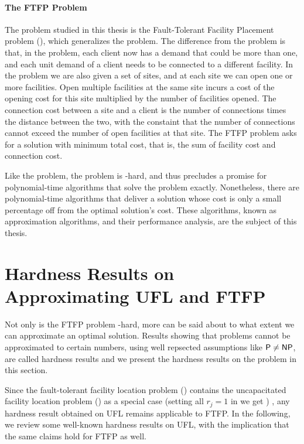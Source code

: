 \documentclass[oneside,final]{ucr}
\begin{document}
\paragraph{The FTFP Problem}
The problem studied in this thesis is the Fault-Tolerant
Facility Placement problem (\FTFP), which generalizes the
{\UFL} problem. The difference from the {\UFL} problem is
that, in the {\FTFP} problem, each client now has a demand
that could be more than one, and each unit demand of a
client needs to be connected to a different facility. In the
{\FTFP} problem we are also given a set of sites, and at
each site we can open one or more facilities. Open multiple
facilities at the same site incurs a cost of the opening
cost for this site multiplied by the number of facilities
opened. The connection cost between a site and a client is
the number of connections times the distance between the
two, with the constaint that the number of connections
cannot exceed the number of open facilities at that
site. The FTFP problem asks for a solution with minimum
total cost, that is, the sum of facility cost and connection
cost.

Like the {\UFL} problem, the {\FTFP} problem is \NP-hard,
and thus precludes a promise for polynomial-time algorithms
that solve the problem exactly. Nonetheless, there are
polynomial-time algorithms that deliver a solution whose
cost is only a small percentage off from the optimal
solution's cost. These algorithms, known as approximation
algorithms, and their performance analysis, are the subject
of this thesis.

\section{Hardness Results on Approximating UFL and FTFP}
\label{sec:hardness}

Not only is the FTFP problem \NP-hard, more can be said
about to what extent we can approximate an optimal
solution. Results showing that problems cannot be
approximated to certain numbers, using well repsected
assumptions like ${\mbox{\sf P}}\neq {\mbox{\sf NP}}$, are called hardness results
and we present the hardness results on the {\FTFP} problem
in this section.

Since the fault-tolerant facility location problem (\FTFP)
contains the uncapacitated facility location problem (\UFL)
as a special case (setting all $r_j=1$ in {\FTFP} we get
{\UFL}) , any hardness result obtained on UFL remains
applicable to FTFP. In the following, we review some
well-known hardness results on UFL, with the implication
that the same claims hold for FTFP as well.
\end{document}
